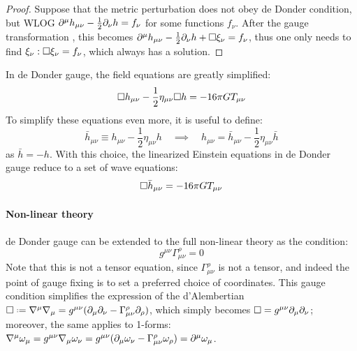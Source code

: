 \begin{proofbox}
  \begin{proof}
    Suppose that the metric perturbation does not obey de Donder condition, but WLOG $ \partial^\mu h_{\mu \nu} - \frac{1}{2} \partial_\nu h = f_\nu $ for some functions $ f_\nu $. After the gauge transformation , this becomes $ \partial^\mu h_{\mu \nu} - \frac{1}{2} \partial_\nu h + \Box \xi_\nu = f_\nu $, thus one only needs to find $ \xi_\nu : \Box \xi_\nu = f_\nu $, which always has a solution.
  \end{proof}
\end{proofbox}

In de Donder gauge, the field equations  are greatly simplified:
\begin{equation}
  \Box h_{\mu \nu} - \frac{1}{2} \eta_{\mu \nu} \Box h = -16\pi G T_{\mu \nu}
\end{equation}
To simplify these equations even more, it is useful to define:
\begin{equation*}
  \bar{h}_{\mu \nu} \equiv h_{\mu \nu} - \frac{1}{2} \eta_{\mu \nu} h
  \quad \implies \quad
  h_{\mu \nu} = \bar{h}_{\mu \nu} - \frac{1}{2} \eta_{\mu \nu} \bar{h}
\end{equation*}
as $ \bar{h} = - h $. With this choice, the linearized Einstein equations in de Donder gauge reduce to a set of wave equations:
\begin{equation}
  \Box \bar{h}_{\mu \nu} = -16\pi G T_{\mu \nu}
  \label{eq:weak-wave-feq}
\end{equation}

\paragraph{Non-linear theory}

de Donder gauge can be extended to the full non-linear theory as the condition:
\begin{equation}
  g^{\mu \nu} \Gamma^\rho_{\mu \nu} = 0
\end{equation}
Note that this is not a tensor equation, since $ \Gamma^\rho_{\mu \nu} $ is not a tensor, and indeed the point of gauge fixing is to set a preferred choice of coordinates. This gauge condition simplifies the expression of the d'Alembertian $ \dal \defeq \na^\mu \na_\mu = g^{\mu \nu} ( \pa_\mu \pa_\nu - \Gamma^\rho_{\mu \nu} \pa_\rho ) $, which simply becomes $ \Box = g^{\mu \nu} \partial_\mu \partial_\nu $; moreover, the same applies to 1-forms: $ \nabla^\mu \omega_\mu = g^{\mu \nu} \nabla_\mu \omega_\nu = g^{\mu \nu} ( \partial_\mu \omega _\nu - \Gamma^\rho_{\mu \nu} \omega_\rho ) = \partial^\mu \omega_\mu $.


